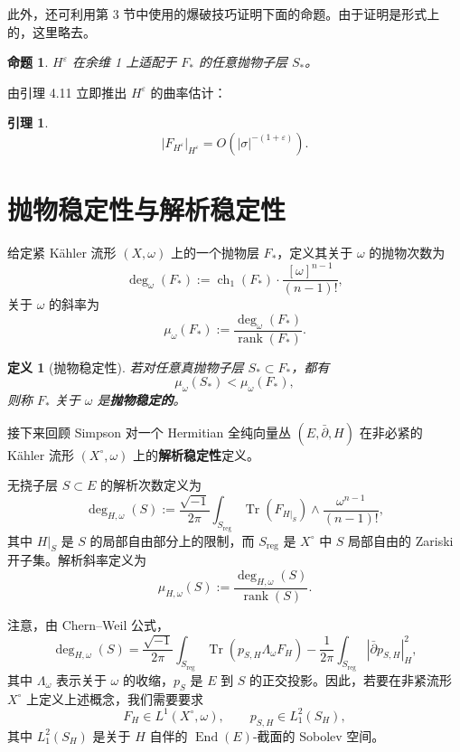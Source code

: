 \documentclass[12pt,a4paper]{article}
\newtheorem{lemma}[theorem]{引理}
\newtheorem{proposition}[theorem]{命题}
\newtheorem{definition}[theorem]{定义}
\newcommand{\ch}{\operatorname{ch}}
\newcommand{\rank}{\operatorname{rank}}
\newcommand{\Tr}{\operatorname{Tr}}
\newcommand{\End}{\operatorname{End}}
\newcommand{\reg}{\mathrm{reg}}
\begin{document}
此外，还可利用第 3 节中使用的爆破技巧证明下面的命题。由于证明是形式上的，这里略去。

\begin{proposition}
\(H^\varepsilon\) 在余维 1 上适配于 \(F_*\) 的任意抛物子层 \(S_*\)。
\end{proposition}

由引理 4.11 立即推出 \(H^\varepsilon\) 的曲率估计：

\begin{lemma}
\[
|F_{H^\varepsilon}|_{H^\varepsilon}=O(|\sigma|^{-(1+\varepsilon)}).
\]
\end{lemma}

\section{抛物稳定性与解析稳定性}

给定紧 Kähler 流形 \((X,\omega)\) 上的一个抛物层 \(F_*\)，定义其关于 \(\omega\) 的抛物次数为
\[
\deg_\omega(F_*):=\ch_1(F_*)\cdot \frac{[\omega]^{n-1}}{(n-1)!},
\]
关于 \(\omega\) 的斜率为
\[
\mu_\omega(F_*):=\frac{\deg_\omega(F_*)}{\rank(F_*)}.
\]

\begin{definition}[抛物稳定性]
若对任意真抛物子层 \(S_*\subset F_*\)，都有
\[
\mu_\omega(S_*)<\mu_\omega(F_*),
\]
则称 \(F_*\) 关于 \(\omega\) 是\textbf{抛物稳定的}。
\end{definition}

接下来回顾 Simpson \cite{SimpsonConstruct} 对一个 Hermitian 全纯向量丛 \((E,\bar\partial,H)\) 在非必紧的 Kähler 流形 \((X^\circ,\omega)\) 上的\textbf{解析稳定性}定义。

无挠子层 \(S\subset E\) 的解析次数定义为
\[
\deg_{H,\omega}(S)
:=
\frac{\sqrt{-1}}{2\pi}
\int_{S_{\reg}}
\Tr(F_{H|_S})\wedge \frac{\omega^{n-1}}{(n-1)!},
\]
其中 \(H|_S\) 是 \(S\) 的局部自由部分上的限制，而 \(S_{\reg}\) 是 \(X^\circ\) 中 \(S\) 局部自由的 Zariski 开子集。解析斜率定义为
\[
\mu_{H,\omega}(S):=\frac{\deg_{H,\omega}(S)}{\rank(S)}.
\]

注意，由 Chern--Weil 公式，
\[
\deg_{H,\omega}(S)
=
\frac{\sqrt{-1}}{2\pi}
\int_{S_{\reg}}\Tr(p_{S,H}\Lambda_\omega F_H)
-
\frac{1}{2\pi}
\int_{S_{\reg}}|\bar\partial p_{S,H}|_H^2,
\]
其中 \(\Lambda_\omega\) 表示关于 \(\omega\) 的收缩，\(p_S\) 是 \(E\) 到 \(S\) 的正交投影。因此，若要在非紧流形 \(X^\circ\) 上定义上述概念，我们需要要求
\[
F_H\in L^1(X^\circ,\omega),\qquad
p_{S,H}\in L_1^2(S_H),
\]
其中 \(L_1^2(S_H)\) 是关于 \(H\) 自伴的 \(\End(E)\)-截面的 Sobolev 空间。
\end{document}
